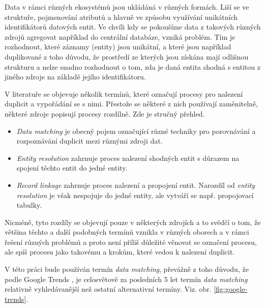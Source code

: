 Data v rámci různých ekosystémů jsou ukládáná v různých formách. Liší se ve struktuře, pojmenování atributů a hlavně ve způsobu využívání unikátních identifikátorů datových entit. Ve chvíli kdy se pokoušíme data z takových různých zdrojů agregovat například do centrální databáze, vzniká problém. Tím je rozhodnout, které záznamy (entity) jsou unikátní, a které jsou například duplikované z toho důvodu, že prostředí ze kterých jsou získána mají odlišnou strukturu a nelze snadno rozhodnout o tom, zda je daná entita shodná s entitou z jiného zdroje na základě jejího identifikátoru.

V literatuře se objevuje několik termínů, které označují procesy pro nalezení duplicit a vypořádání se s nimi. Přestože se některé z nich používají zaměnitelně, některé zdroje popisují procesy rozdílně. Zde je stručný přehled.

\begin{itemize}
    \item \textit{Data matching} je obecný pojem označující různé techniky pro porovnávání a rozpoznávání duplicit mezi různými zdroji dat.\cite{christen_data_2012}
    \item \textit{Entity resolution} zahrnuje proces nalezení shodných entit s důrazem na spojení těchto entit do jedné entity. \cite{quantexa_what_2024}
    \item \textit{Record linkage} zahrnuje proces nalezení a propojení entit. Narozdíl od \textit{entity resolution} je však nespojuje do jedné entity, ale vytváří se např. propojovací tabulky. \cite{stepanenko_what_2024}
\end{itemize}

Nicméně, tyto rozdíly se objevují pouze v některých zdrojích a to svědčí o tom, že většina těchto a další podobných termínů vznikla v různých oborech a v rámci řešení různých problémů a proto není příliš důležité věnovat se označení procesu, ale spíš procesu jako takovému a krokům, které vedou k nalezení duplicit.\cite{christen_data_2012}

V této práci bude používán termín  \textit{data matching}, převážně z toho důvodu, že podle Google Trends \cite{google_trends_google_2024}, je celosvětově za posledních 5 let termín \textit{data matching} relativně vyhledávanější než ostatní alternativní termíny. Viz. obr. \ref{fig:google-trends}.

